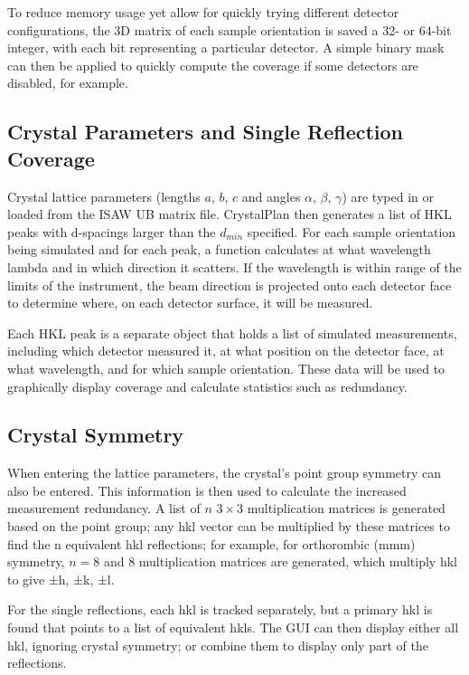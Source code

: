 \documentclass{iucr}              %
\begin{document}
To reduce memory usage yet allow for quickly trying different detector
configurations, the 3D matrix of each sample orientation is saved a 32- or
64-bit integer, with each bit representing a particular detector. A simple
binary mask can then be applied to quickly compute the coverage if some
detectors are disabled, for example.          




\subsection{Crystal Parameters and Single Reflection Coverage}

Crystal lattice parameters (lengths $a$, $b$, $c$ and angles $\alpha$, $\beta$,
$\gamma$) are typed in or loaded from the ISAW UB matrix file. CrystalPlan then
generates a list of HKL peaks with d-spacings larger than the $d_{min}$ specified. For each
sample orientation being simulated and for each peak, a function calculates at
what wavelength lambda and in which direction it scatters. If the wavelength is
within range of the limits of the instrument, the beam direction is projected
onto each detector face to determine where, on each detector surface, it will be
measured. 
 
Each HKL peak is a separate object that holds a list of simulated measurements,
including which detector measured it, at what position on the detector face, at
what wavelength, and for which sample orientation. These data will be used to
graphically display coverage and calculate statistics such as redundancy.            



\subsection{Crystal Symmetry}

When entering the lattice parameters, the crystal's point group symmetry can
also be entered. This information is then used to calculate the increased
measurement redundancy. A list of $n$ $3\times3$ multiplication matrices is
generated based on the point group; any {hkl} vector can be multiplied by these matrices
to find the n equivalent hkl reflections; for example, for orthorombic (mmm)
symmetry, $n=8$ and 8 multiplication matrices are generated, which multiply
{hkl} to give {±h, ±k, ±l}.              

For the single reflections, each hkl is tracked separately, but a primary hkl is
found that points to a list of equivalent hkls. The GUI can then display either
all hkl, ignoring crystal symmetry; or combine them to display only part of the
reflections.             
\end{document}

